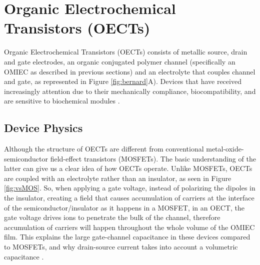 
\section{Organic Electrochemical Transistors (OECTs)} \label{sec:OECTs}

Organic Electrochemical Transistors (OECTs) consists of metallic source, drain and gate electrodes, an organic conjugated polymer channel (specifically an OMIEC as described in previous sections) and an electrolyte that couples channel and gate, as represented in Figure \ref{fig:bernard}A). Devices that have received increasingly attention due to their mechanically compliance, biocompatibility, and are sensitive to biochemical modules \cite{tanMixedIonicElectronic2022}. 



\subsection{Device Physics} \label{subsec:devphy}

Although the structure of OECTs are different from conventional metal-oxide-semiconductor field-effect transistors (MOSFETs). The basic understanding of the latter can give us a clear idea of how OECTs operate. Unlike MOSFETs, OECTs are coupled with an electrolyte rather than an insulator, as seen in Figure \ref{fig:vsMOS}. So, when applying a gate voltage, instead of polarizing the dipoles in the insulator, creating a field that causes accumulation of carriers at the interface of the semiconductor/insulator as it happens in a MOSFET, in an OECT, the gate voltage drives ions to penetrate the bulk of the channel, therefore accumulation of carriers will happen throughout the whole volume of the OMIEC film. This explains the large gate-channel capacitance in these devices compared to MOSFETs, and why drain-source current takes into account a volumetric capacitance \cite{friedleinDevicePhysicsOrganic2018}.


